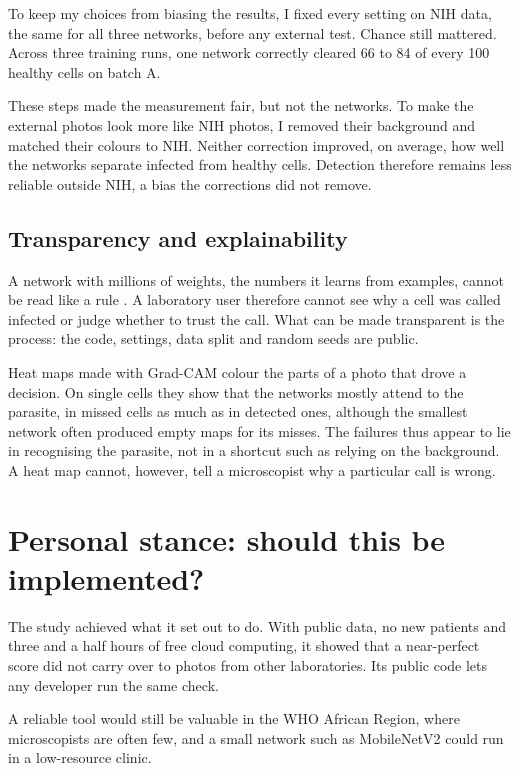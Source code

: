 \documentclass[11pt,a4paper]{article}
\begin{document}
To keep my choices from biasing the results, I fixed every setting on NIH data, the same for all three networks, before any external test. Chance still mattered. Across three training runs, one network correctly cleared 66 to 84 of every 100 healthy cells on batch A.

These steps made the measurement fair, but not the networks. To make the external photos look more like NIH photos, I removed their background and matched their colours to NIH. Neither correction improved, on average, how well the networks separate infected from healthy cells. Detection therefore remains less reliable outside NIH, a bias the corrections did not remove.

\subsection{Transparency and explainability}

A network with millions of weights, the numbers it learns from examples, cannot be read like a rule \citep{burrell2016}. A laboratory user therefore cannot see why a cell was called infected or judge whether to trust the call. What can be made transparent is the process: the code, settings, data split and random seeds are public.

Heat maps made with Grad-CAM \citep{selvaraju2017} colour the parts of a photo that drove a decision. On single cells they show that the networks mostly attend to the parasite, in missed cells as much as in detected ones, although the smallest network often produced empty maps for its misses. The failures thus appear to lie in recognising the parasite, not in a shortcut such as relying on the background. A heat map cannot, however, tell a microscopist why a particular call is wrong.

\section{Personal stance: should this be implemented?}

The study achieved what it set out to do. With public data, no new patients and three and a half hours of free cloud computing, it showed that a near-perfect score did not carry over to photos from other laboratories. Its public code lets any developer run the same check.

A reliable tool would still be valuable in the WHO African Region, where microscopists are often few, and a small network such as \mbox{MobileNetV2} could run in a low-resource clinic.
\end{document}
